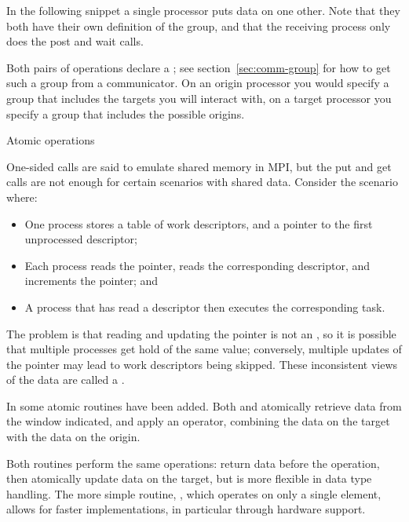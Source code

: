 In the following snippet a single processor puts data on one
other. Note that they both have their own definition of the group, and
that the receiving process only does the post and wait calls.
%

Both pairs of operations declare a
; see section~\ref{sec:comm-group}
for how to get such a group from a communicator.
On an origin processor you would specify a group that includes the targets
you will interact with, on a target processor you specify a group
that includes the possible origins.

 {Atomic operations}
\label{sec:mpi-atomic}

One-sided calls are said to emulate shared memory in MPI, but 
the put and get calls are not enough for certain scenarios with shared
data. Consider the scenario where:

\begin{itemize}
\item One process stores a table of work descriptors, and a pointer to
  the first unprocessed descriptor;
\item Each process reads the pointer, reads the corresponding
  descriptor, and increments the pointer; and
\item A process that has read a descriptor then executes the
  corresponding task.
\end{itemize}

The problem is that reading and updating the pointer is not an
, so
it is possible that multiple processes get hold of the same value;
conversely, multiple updates of the pointer may lead to work
descriptors being skipped. These inconsistent views of the data are
called a .

In  some atomic routines have been added.
Both  and 
atomically retrieve data from the window indicated,
and apply an operator, combining the data on the target
with the data on the origin.

Both routines perform the same operations: return data before the
operation, then atomically update data on the target, but
 is more flexible in data type
handling. The more simple routine, ,
which operates on only a single element,
allows for faster implementations, in particular through hardware support.

